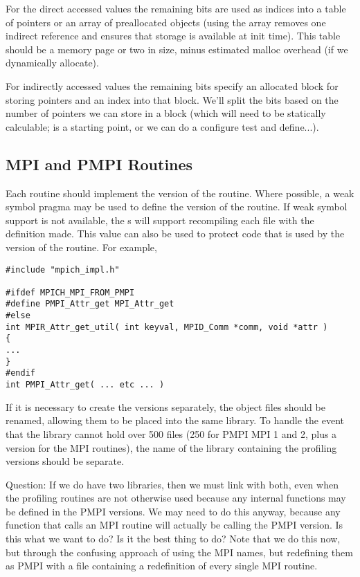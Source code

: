 \documentclass{article}
\begin{document}
For the direct accessed values the remaining bits are used as indices into
a table of pointers or an array of preallocated objects (using the array
removes one indirect reference and ensures that storage is available at init
time).  This table should be 
a memory page or two in size, 
minus estimated malloc overhead (if we dynamically allocate).

For indirectly accessed values the remaining bits specify an allocated block
for storing pointers and an index into that block.  We'll split the bits
based on the number of pointers we can store in a block (which will need
to be statically calculable;  is a starting point, or we
can  do a configure test and define...).

\subsection{MPI and PMPI Routines}
Each routine should implement the  version of the routine.
Where possible, a weak symbol pragma may be used to define the
 version of the routine.  If weak symbol support is not
available, the s will support recompiling each file
with the definition  made.  This value
can also be used to protect code that is used by the 
version of the routine.  For example, 
\begin{verbatim}
#include "mpich_impl.h"

#ifdef MPICH_MPI_FROM_PMPI
#define PMPI_Attr_get MPI_Attr_get
#else
int MPIR_Attr_get_util( int keyval, MPID_Comm *comm, void *attr )
{
...
}
#endif
int PMPI_Attr_get( ... etc ... )
\end{verbatim}

If it is necessary to create the  versions separately, the
object files should be renamed, allowing them to be placed into the
same library.  To handle the event that the library cannot hold over
500 files (250 for PMPI MPI 1 and 2, plus a version for the MPI
routines), the name of the library containing the profiling versions
should be separate.

Question: If we do have two libraries, then we must link with both,
even when the profiling routines are not otherwise used because any
internal functions may be defined in the PMPI versions.  We may need
to do this anyway, because any function that calls an MPI routine will
actually be calling the PMPI version.  Is this what we want to do?  Is
it the best thing to do?  Note that we do this now, but through the
confusing approach of using the MPI names, but redefining them as PMPI
with a file containing a redefinition of every single MPI routine.
\end{document}
